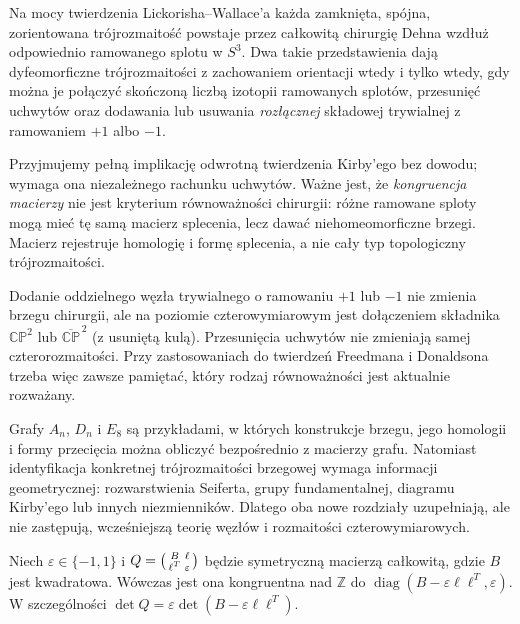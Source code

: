 \begin{twierdzenie}
Na mocy twierdzenia Lickorisha--Wallace'a każda zamknięta,
spójna, zorientowana trójrozmaitość powstaje przez
całkowitą chirurgię Dehna wzdłuż odpowiednio
ramowanego splotu w $S^3$.
Dwa takie przedstawienia dają dyfeomorficzne
trójrozmaitości z zachowaniem orientacji wtedy i tylko wtedy,
gdy można je połączyć skończoną liczbą izotopii
ramowanych splotów, przesunięć uchwytów oraz
dodawania lub usuwania \emph{rozłącznej} składowej
trywialnej z ramowaniem $+1$ albo $-1$.
\end{twierdzenie}

Przyjmujemy pełną implikację odwrotną twierdzenia
Kirby'ego bez dowodu; wymaga ona niezależnego
rachunku uchwytów. Ważne jest, że \emph{kongruencja
macierzy} nie jest kryterium równoważności chirurgii:
różne ramowane sploty mogą mieć tę samą macierz
splecenia, lecz dawać niehomeomorficzne brzegi.
Macierz rejestruje homologię i formę splecenia,
a nie cały typ topologiczny trójrozmaitości.

\begin{uwaga}
Dodanie oddzielnego węzła trywialnego o ramowaniu
$+1$ lub $-1$ nie zmienia brzegu chirurgii,
ale na poziomie czterowymiarowym jest dołączeniem
składnika $\mathbb{CP}^2$ lub
$\overline{\mathbb{CP}}^{\,2}$ (z usuniętą kulą).
Przesunięcia uchwytów nie zmieniają samej
czterorozmaitości. Przy zastosowaniach do twierdzeń
Freedmana i Donaldsona trzeba więc zawsze pamiętać,
który rodzaj równoważności jest aktualnie rozważany.
\end{uwaga}

\begin{uwaga}
Grafy $A_n$, $D_n$ i $E_8$ są przykładami, w których
konstrukcje brzegu, jego homologii i formy przecięcia
można obliczyć bezpośrednio z macierzy grafu. Natomiast
identyfikacja konkretnej trójrozmaitości brzegowej
wymaga informacji geometrycznej: rozwarstwienia
Seiferta, grupy fundamentalnej, diagramu Kirby'ego
lub innych niezmienników. Dlatego oba nowe rozdziały
uzupełniają, ale nie zastępują, wcześniejszą teorię
węzłów i rozmaitości czterowymiarowych.
\end{uwaga}


\begin{lemat}
\label{lem:tg-audit-schur}
Niech $\varepsilon\in\{-1,1\}$ i
$Q=\begin{psmallmatrix}B&\ell\\\ell^T&\varepsilon\end{psmallmatrix}$
będzie symetryczną macierzą całkowitą, gdzie $B$ jest
kwadratowa. Wówczas jest ona kongruentna nad
$\mathbb Z$ do
$\operatorname{diag}(B-\varepsilon\ell\ell^T,\varepsilon)$.
W szczególności
$\det Q=\varepsilon\det(B-\varepsilon\ell\ell^T)$.
\end{lemat}

